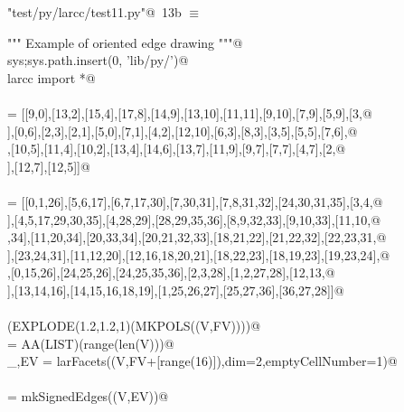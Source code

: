 \documentclass[11pt,oneside]{article}	%
\begin{document}
\begin{flushleft} \small \label{scrap25}
\protect{}\verb@"test/py/larcc/test11.py"@\nobreak\ {\footnotesize 13b }$\equiv$
\vspace{-1ex}
\begin{list}{}{} \item
\mbox{}\verb@""" Example of oriented edge drawing """@\\
\mbox{}\verb@import sys;sys.path.insert(0, 'lib/py/')@\\
\mbox{}\verb@from larcc import *@\\
\mbox{}\verb@@\\
\mbox{}\verb@V = [[9,0],[13,2],[15,4],[17,8],[14,9],[13,10],[11,11],[9,10],[7,9],[5,9],[3,@\\
\mbox{}],[0,6],[2,3],[2,1],[5,0],[7,1],[4,2],[12,10],[6,3],[8,3],[3,5],[5,5],[7,6],@\\
\mbox{}\verb@[8,5],[10,5],[11,4],[10,2],[13,4],[14,6],[13,7],[11,9],[9,7],[7,7],[4,7],[2,@\\
\mbox{}],[12,7],[12,5]]@\\
\mbox{}\verb@@\\
\mbox{}\verb@FV = [[0,1,26],[5,6,17],[6,7,17,30],[7,30,31],[7,8,31,32],[24,30,31,35],[3,4,@\\
\mbox{}],[4,5,17,29,30,35],[4,28,29],[28,29,35,36],[8,9,32,33],[9,10,33],[11,10,@\\
\mbox{},34],[11,20,34],[20,33,34],[20,21,32,33],[18,21,22],[21,22,32],[22,23,31,@\\
\mbox{}],[23,24,31],[11,12,20],[12,16,18,20,21],[18,22,23],[18,19,23],[19,23,24],@\\
\mbox{}\verb@[15,19,24,26],[0,15,26],[24,25,26],[24,25,35,36],[2,3,28],[1,2,27,28],[12,13,@\\
\mbox{}],[13,14,16],[14,15,16,18,19],[1,25,26,27],[25,27,36],[36,27,28]]@\\
\mbox{}\verb@@\\
\mbox{}\verb@VIEW(EXPLODE(1.2,1.2,1)(MKPOLS((V,FV))))@\\
\mbox{}\verb@VV = AA(LIST)(range(len(V)))@\\
\mbox{}\verb@_,EV = larFacets((V,FV+[range(16)]),dim=2,emptyCellNumber=1)@\\
\mbox{}\verb@@\\
\mbox{}\verb@submodel = mkSignedEdges((V,EV))@\\

\end{list}
\end{flushleft}
\end{document}
